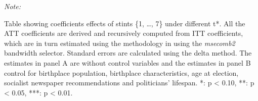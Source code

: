 \begin{table}[!h]
\begin{threeparttable}
\begin{tablenotes}[para]
\item \textit{Note: } 
\item Table showing coefficients effects of stints \{1, \dots, 7\} under different t*. All the ATT coefficients are derived and recursively computed from ITT coefficients, which are in turn estimated using the methodology in \citep{cattaneo2019practical} using the \textit{msecomb2} bandwidth selector. Standard errors are calculated using the delta method. The estimates in panel A are without control variables and the estimates in panel B control for birthplace population, birthplace characteristics, age at election, socialist newspaper recommendations and politicians' lifespan. *: p < 0.10, **: p < 0.05, ***: p < 0.01. 
\end{tablenotes}
\end{threeparttable}
\end{table}

